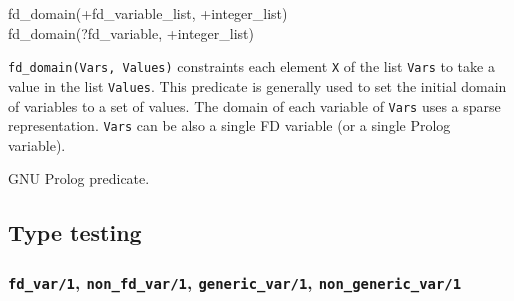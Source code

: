 \begin{TemplatesOneCol}
fd\_domain(+fd\_variable\_list, +integer\_list)\\
fd\_domain(?fd\_variable, +integer\_list)

\end{TemplatesOneCol}

\Description

\texttt{fd\_domain(Vars, Values)} constraints each element \texttt{X} of the
list \texttt{Vars} to take a value in the list \texttt{Values}. This
predicate is generally used to set the initial domain of variables to a set
of values. The domain of each variable of \texttt{Vars} uses a sparse
representation. \texttt{Vars} can be also a single FD variable (or a single
Prolog variable).

\begin{PlErrors}







\end{PlErrors}

\Portability

GNU Prolog predicate.

\subsection{Type testing}

\subsubsection{\texttt{fd\_var/1}, \texttt{non\_fd\_var/1}, 
               \texttt{generic\_var/1},
               \texttt{non\_generic\_var/1}}

